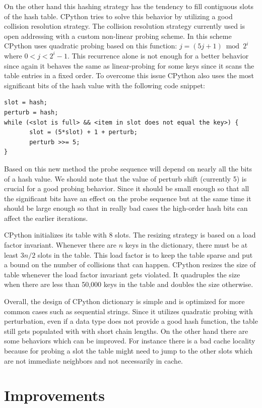 \documentclass[12pt]{article}
\begin{document}
On the other hand this hashing strategy has the tendency to fill contiguous slots of the
hash table. CPython tries to solve this behavior by utilizing a good collision resolution strategy. The collision resolution strategy currently used is open addressing with a custom non-linear probing scheme. In this scheme CPython uses quadratic probing based on this function: $j = (5j + 1) \bmod 2^i$ where $0<j<2^i-1$. This recurrence alone is not enough for a better behavior since again it behaves the same as linear-probing for some keys since it scans the table entries in a fixed order. To overcome this issue CPython also uses the most significant bits of the hash value with the following code snippet:
\begin{verbatim}
slot = hash;
perturb = hash;
while (<slot is full> && <item in slot does not equal the key>) {
       slot = (5*slot) + 1 + perturb;
       perturb >>= 5;
}
\end{verbatim}
Based on this new method the probe sequence will depend on nearly all the bits of a hash value. We should note that the value of  perturb shift (currently 5) is crucial for a good probing behavior. Since it should be small enough so that  all the significant bits have an  effect on the probe sequence but at the same time it should be large enough so that in really bad cases the high-order hash bits can affect the earlier iterations.

CPython initializes its table with 8 slots. The resizing strategy is based on a load factor invariant. Whenever there are $n$ keys in the dictionary, there must be at least $3n/2$ slots in the table. This load factor is to keep the table sparse and put a bound on the number of collisions that can happen. CPython resizes the size of table whenever the load factor invariant gets violated. It quadruples the size when there are less than 50,000 keys in the table and doubles the size otherwise. 

Overall, the design of CPython dictionary is simple and is optimized for more common cases such as sequential strings. Since it utilizes quadratic probing with perturbation, even if a data type does not provide a good hash function, the table still gets populated with with short chain lengths.  On the other hand there are some behaviors which can be improved. For instance there is a bad cache locality because for probing a slot the table might need to jump to the other slots which are not immediate neighbors and not necessarily in cache. 

\section{Improvements}
\end{document}
